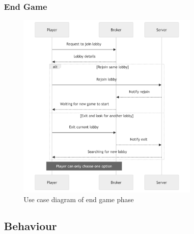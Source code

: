 \documentclass{scrartcl}
\begin{document}
\subsubsection{End Game}\label{end-game}
\begin{figure}[H]
  \centering
  \includegraphics[width=0.8\textwidth]{figures/sequenceEndGame.png}
  \caption{Use case diagram of end game phase} 
  \label{fig:end-game}
\end{figure}


\subsection{Behaviour}\label{behaviour}

\end{document}
